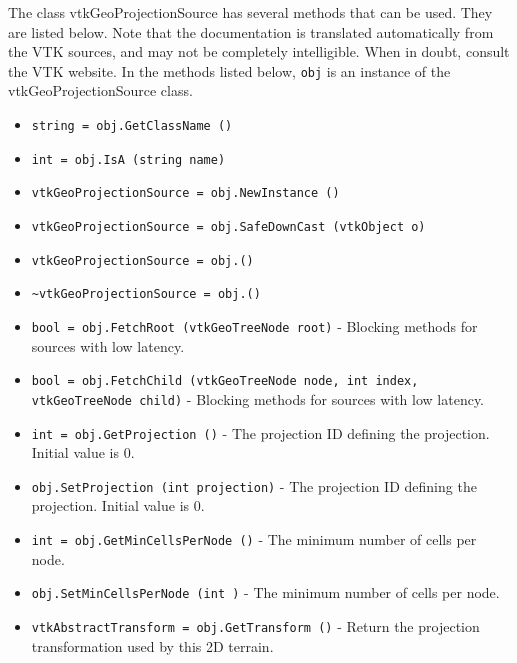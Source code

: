 The class vtkGeoProjectionSource has several methods that can be used.
  They are listed below.
Note that the documentation is translated automatically from the VTK sources,
and may not be completely intelligible.  When in doubt, consult the VTK website.
In the methods listed below, \verb|obj| is an instance of the vtkGeoProjectionSource class.
\begin{itemize}
\item  \verb|string = obj.GetClassName ()|

\item  \verb|int = obj.IsA (string name)|

\item  \verb|vtkGeoProjectionSource = obj.NewInstance ()|

\item  \verb|vtkGeoProjectionSource = obj.SafeDownCast (vtkObject o)|

\item  \verb|vtkGeoProjectionSource = obj.()|

\item  \verb|~vtkGeoProjectionSource = obj.()|

\item  \verb|bool = obj.FetchRoot (vtkGeoTreeNode root)| -  Blocking methods for sources with low latency.

\item  \verb|bool = obj.FetchChild (vtkGeoTreeNode node, int index, vtkGeoTreeNode child)| -  Blocking methods for sources with low latency.

\item  \verb|int = obj.GetProjection ()| -  The projection ID defining the projection. Initial value is 0.

\item  \verb|obj.SetProjection (int projection)| -  The projection ID defining the projection. Initial value is 0.

\item  \verb|int = obj.GetMinCellsPerNode ()| -  The minimum number of cells per node.

\item  \verb|obj.SetMinCellsPerNode (int )| -  The minimum number of cells per node.

\item  \verb|vtkAbstractTransform = obj.GetTransform ()| -  Return the projection transformation used by this 2D terrain.

\end{itemize}
